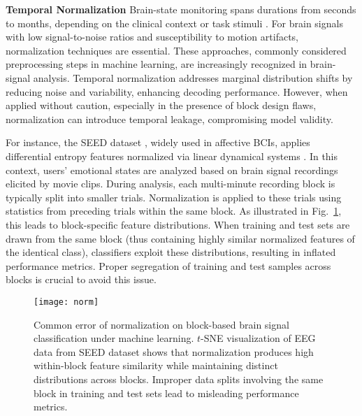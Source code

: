 \documentclass[journal]{IEEEtran}
\begin{document}
\textbf{Temporal Normalization} Brain-state monitoring spans durations from seconds to months, depending on the clinical context or task stimuli \cite{Gilron2021}. For brain signals with low signal-to-noise ratios and susceptibility to motion artifacts, normalization techniques are essential. These approaches, commonly considered preprocessing steps in machine learning, are increasingly recognized in brain-signal analysis. Temporal normalization addresses marginal distribution shifts \cite{Wu2022a, Apicella2023} by reducing noise and variability, enhancing decoding performance. However, when applied without caution, especially in the presence of block design flaws, normalization can introduce temporal leakage, compromising model validity.

For instance, the SEED dataset \cite{Zheng2015}, widely used in affective BCIs, applies differential entropy features normalized via linear dynamical systems \cite{Shi2010}. In this context, users' emotional states are analyzed based on brain signal recordings elicited by movie clips. During analysis, each multi-minute recording block is typically split into smaller trials. Normalization is applied to these trials using statistics from preceding trials within the same block. As illustrated in Fig.~\ref{fig:norm}, this leads to block-specific feature distributions. When training and test sets are drawn from the same block (thus containing highly similar normalized features of the identical class), classifiers exploit these distributions, resulting in inflated performance metrics. Proper segregation of training and test samples across blocks is crucial to avoid this issue.

\begin{figure}[htpb] \centering
\texttt{[image: norm]}
\caption{Common error of normalization on block-based brain signal classification under machine learning. $t$-SNE visualization of EEG data from SEED dataset shows that normalization produces high within-block feature similarity while maintaining distinct distributions across blocks. Improper data splits involving the same block in training and test sets lead to misleading performance metrics.} \label{fig:norm}
\end{figure}
\end{document}
